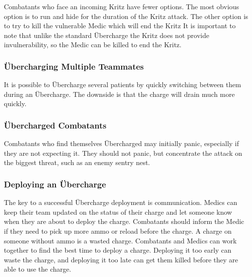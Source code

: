 \newpage

Combatants who face an incoming Kritz have fewer options. The most obvious option is to run and hide for the duration of the Kritz attack. The other option is to try to kill the vulnerable Medic which will end the Kritz  It is important to note that unlike the standard Übercharge the Kritz does not provide invulnerability, so the Medic can be killed to end the Kritz.

\subsubsection{Übercharging Multiple Teammates}
It is possible to Übercharge several patients by quickly switching between them during an Übercharge. The downside is that the charge will drain much more quickly.

\subsubsection{Übercharged Combatants}
Combatants who find themselves Übercharged may initially panic, especially if they are not expecting it.  They should not panic, but concentrate the attack on the biggest threat, such as an enemy sentry nest.

\subsubsection{Deploying an Übercharge}
The key to a successful Übercharge deployment is communication.  Medics can keep their team updated on the status of their charge and let someone know when they are about to deploy the charge.  Combatants should inform the Medic if they need to pick up more ammo or reload before the charge.  A charge on someone without ammo is a wasted charge.  Combatants and Medics can work together to find the best time to deploy a charge.  Deploying it too early can waste the charge, and deploying it too late can get them killed before they are able to use the charge. 